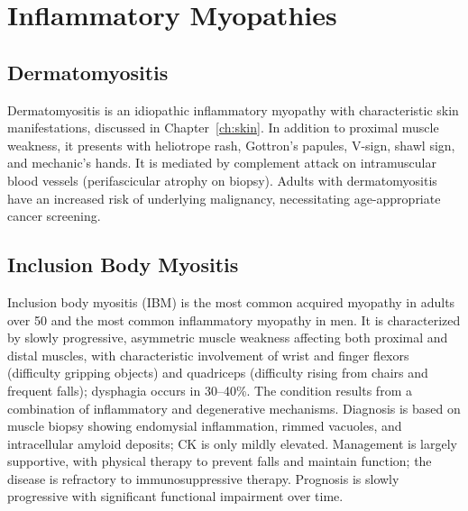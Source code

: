 \section{Inflammatory Myopathies}








\label{sec:Inflammatory Myopathies}

\subsection{Dermatomyositis}
\label{sec:Dermatomyositis}
Dermatomyositis is an idiopathic inflammatory myopathy with characteristic skin manifestations, discussed in Chapter~\ref{ch:skin}. In addition to proximal muscle weakness, it presents with heliotrope rash, Gottron's papules, V-sign, shawl sign, and mechanic's hands. It is mediated by complement attack on intramuscular blood vessels (perifascicular atrophy on biopsy). Adults with dermatomyositis have an increased risk of underlying malignancy, necessitating age-appropriate cancer screening.

\subsection{Inclusion Body Myositis}
\label{sec:Inclusion Body Myositis}
Inclusion body myositis (IBM) is the most common acquired myopathy in adults over 50 and the most common inflammatory myopathy in men. It is characterized by slowly progressive, asymmetric muscle weakness affecting both proximal and distal muscles, with characteristic involvement of wrist and finger flexors (difficulty gripping objects) and quadriceps (difficulty rising from chairs and frequent falls); dysphagia occurs in 30--40\%. The condition results from a combination of inflammatory and degenerative mechanisms. Diagnosis is based on muscle biopsy showing endomysial inflammation, rimmed vacuoles, and intracellular amyloid deposits; CK is only mildly elevated. Management is largely supportive, with physical therapy to prevent falls and maintain function; the disease is refractory to immunosuppressive therapy. Prognosis is slowly progressive with significant functional impairment over time.


